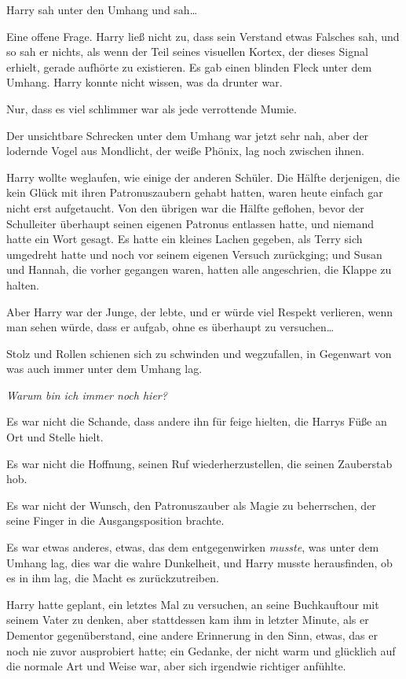 {Harry sah unter den Umhang und sah…

Eine offene Frage. Harry ließ nicht zu, dass sein Verstand etwas Falsches sah, und so sah er nichts, als wenn der Teil seines visuellen Kortex, der dieses Signal erhielt, gerade aufhörte zu existieren. Es gab einen blinden Fleck unter dem Umhang. Harry konnte nicht wissen, was da drunter war.

Nur, dass es viel schlimmer war als jede verrottende Mumie.

Der unsichtbare Schrecken unter dem Umhang war jetzt sehr nah, aber der lodernde Vogel aus Mondlicht, der weiße Phönix, lag noch zwischen ihnen.

Harry wollte weglaufen, wie einige der anderen Schüler. Die Hälfte derjenigen, die kein Glück mit ihren Patronuszaubern gehabt hatten, waren heute einfach gar nicht erst aufgetaucht. Von den übrigen war die Hälfte geflohen, bevor der Schulleiter überhaupt seinen eigenen Patronus entlassen hatte, und niemand hatte ein Wort gesagt. Es hatte ein kleines Lachen gegeben, als Terry sich umgedreht hatte und noch vor seinem eigenen Versuch zurückging; und Susan und Hannah, die vorher gegangen waren, hatten alle angeschrien, die Klappe zu halten.

Aber Harry war der Junge, der lebte, und er würde viel Respekt verlieren, wenn man sehen würde, dass er aufgab, ohne es überhaupt zu versuchen…

Stolz und Rollen schienen sich zu schwinden und wegzufallen, in Gegenwart von was auch immer unter dem Umhang lag.

\emph{\emph{Warum bin ich immer noch hier?}}

Es war nicht die Schande, dass andere ihn für feige hielten, die Harrys Füße an Ort und Stelle hielt.

Es war nicht die Hoffnung, seinen Ruf wiederherzustellen, die seinen Zauberstab hob.

Es war nicht der Wunsch, den Patronuszauber als Magie zu beherrschen, der seine Finger in die Ausgangsposition brachte.

Es war etwas anderes, etwas, das dem entgegenwirken \emph{musste}, was unter dem Umhang lag, dies war die wahre Dunkelheit, und Harry musste herausfinden, ob es in ihm lag, die Macht es zurückzutreiben.

Harry hatte geplant, ein letztes Mal zu versuchen, an seine Buchkauftour mit seinem Vater zu denken, aber stattdessen kam ihm in letzter Minute, als er Dementor gegenüberstand, eine andere Erinnerung in den Sinn, etwas, das er noch nie zuvor ausprobiert hatte; ein Gedanke, der nicht warm und glücklich auf die normale Art und Weise war, aber sich irgendwie richtiger anfühlte.

}
